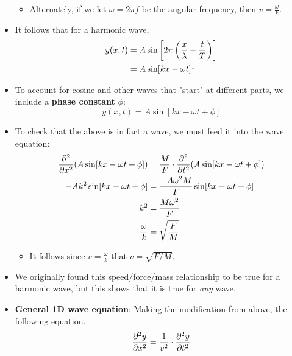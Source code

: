 \documentclass[../notes.tex]{subfiles}
\begin{document}
\begin{itemize}
\begin{itemize}
        \item Alternately, if we let $\omega=2\pi f$ be the angular frequency, then $v=\frac{\omega}{k}$.
    \end{itemize}
    \item It follows that for a harmonic wave,
    \begin{align*}
        y(x,t) &= A\sin\left[ 2\pi\left( \frac{x}{\lambda}-\frac{t}{T} \right) \right]\\
        &= A\sin[kx-\omega t]\footnotemark
    \end{align*}
    \item To account for cosine and other waves that "start" at different parts, we include a \textbf{phase constant} $\phi$:
    \begin{equation*}
        y(x,t) = A\sin[kx-\omega t+\phi]
    \end{equation*}
    \item To check that the above is in fact a wave, we must feed it into the wave equation:
    \begin{align*}
        \pdv[2]{x}(A\sin[kx-\omega t+\phi]) &= \frac{M}{F}\cdot\pdv[2]{t}(A\sin[kx-\omega t+\phi])\\
        -Ak^2\sin[kx-\omega t+\phi] &= \frac{-A\omega^2M}{F}\sin[kx-\omega t+\phi]\\
        k^2 &= \frac{M\omega^2}{F}\\
        \frac{\omega}{k} &= \sqrt{\frac{F}{M}}
    \end{align*}
    \begin{itemize}
        \item It follows since $v=\frac{\omega}{k}$ that $v=\sqrt{F/M}$.
    \end{itemize}
    \item We originally found this speed/force/mass relationship to be true for a harmonic wave, but this shows that it is true for \emph{any} wave.
    \item \textbf{General 1D wave equation}: Making the modification from above, the following equation.
    \begin{equation*}
        \pdv[2]{y}{x} = \frac{1}{v^2}\cdot\pdv[2]{y}{t}
    \end{equation*}
\end{itemize}
\end{document}
